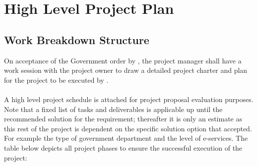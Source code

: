 \section{High Level Project Plan}
\subsection{Work Breakdown Structure}
On acceptance of the Government order by \vendor, the \vendor project manager shall have a work session with the \client project owner to draw a detailed project charter and plan for the project to be executed by \vendor.  
\\ \\
A high level project schedule is attached for project proposal evaluation purposes. Note that a fixed list of tasks and deliverables is applicable up until the recommended solution for the requirement; thereafter it is only an estimate as this rest of the project is dependent on the specific solution option that \client accepted. For example the type of government department and the level of e-services.  The table below depicts all project phases to ensure the successful execution of the project:
